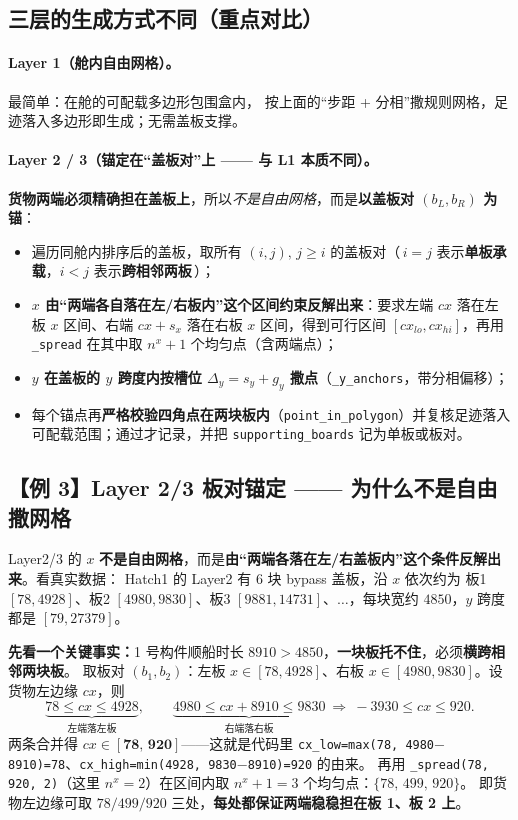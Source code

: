 \documentclass[11pt]{ctexart}
\newcommand{\code}[1]{\texttt{#1}}
\begin{document}
\subsection{三层的生成方式不同（重点对比）}

\paragraph{Layer 1（舱内自由网格）。}最简单：在舱的可配载多边形包围盒内，
按上面的“步距 + 分相”撒规则网格，足迹落入多边形即生成；无需盖板支撑。

\paragraph{Layer 2 / 3（锚定在“盖板对”上 —— 与 L1 本质不同）。}
\textbf{货物两端必须精确担在盖板上}，所以\emph{不是自由网格}，而是\textbf{以盖板对 $(b_L,b_R)$ 为锚}：
\begin{itemize}[leftmargin=1.8em,itemsep=2pt]
  \item 遍历同舱内排序后的盖板，取所有 $(i,j),\,j\ge i$ 的盖板对（\,$i=j$ 表示\textbf{单板承载}，$i<j$ 表示\textbf{跨相邻两板}\,）；
  \item \textbf{$x$ 由“两端各自落在左/右板内”这个区间约束反解出来}：要求左端 $cx$ 落在左板 $x$ 区间、右端 $cx+s_x$ 落在右板 $x$ 区间，得到可行区间 $[cx_{lo},cx_{hi}]$，再用 \code{\_spread} 在其中取 $n^x+1$ 个均匀点（含两端点）；
  \item \textbf{$y$ 在盖板的 $y$ 跨度内按槽位 $\Delta_y=s_y+g_y$ 撒点}（\code{\_y\_anchors}，带分相偏移）；
  \item 每个锚点再\textbf{严格校验四角点在两块板内}（\code{point\_in\_polygon}）并复核足迹落入可配载范围；通过才记录，并把 \code{supporting\_boards} 记为单板或板对。
\end{itemize}

\subsection{【例 3】Layer 2/3 板对锚定 —— 为什么不是自由撒网格}
Layer2/3 的 $x$ \textbf{不是自由网格}，而是\textbf{由“两端各落在左/右盖板内”这个条件反解出来}。看真实数据：
Hatch1 的 Layer2 有 6 块 bypass 盖板，沿 $x$ 依次约为
板1 $[78,4928]$、板2 $[4980,9830]$、板3 $[9881,14731]$、$\dots$，每块宽约 $4850$，$y$ 跨度都是 $[79,27379]$。

\textbf{先看一个关键事实：}1 号构件顺船时长 $8910>4850$，\textbf{一块板托不住}，必须\textbf{横跨相邻两块板}。
取板对 $(b_1,b_2)$：左板 $x\in[78,4928]$、右板 $x\in[4980,9830]$。设货物左边缘 $cx$，则
\[
\underbrace{78\le cx\le 4928}_{\text{左端落左板}},\qquad
\underbrace{4980\le cx+8910\le 9830}_{\text{右端落右板}}\ \Rightarrow\ -3930\le cx\le 920.
\]
两条合并得 $cx\in[\mathbf{78},\,\mathbf{920}]$——这就是代码里 \code{cx\_low=max(78,\,4980$-$8910)=78}、\code{cx\_high=min(4928,\,9830$-$8910)=920} 的由来。
再用 \code{\_spread(78,\,920,\,2)}（这里 $n^x{=}2$）在区间内取 $n^x{+}1=3$ 个均匀点：$\{78,\,499,\,920\}$。
即货物左边缘可取 $78/499/920$ 三处，\textbf{每处都保证两端稳稳担在板 1、板 2 上}。
\end{document}
